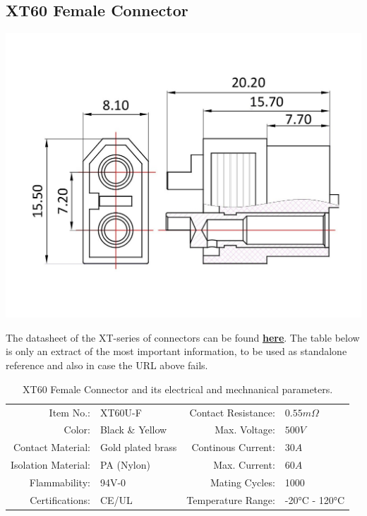 \clearpage %

\subsection{XT60 Female Connector}

\includegraphics[width=\textwidth]{contents/figures/xt60_f.jpg}

The datasheet of the XT-series of connectors can be found \href{https://www.lcsc.com/datasheet/lcsc_datasheet_1810251322_Changzhou-Amass-Elec-XT60-F_C98734.pdf}{\textbf{\underline{here}}}.
The table below is only an extract of the most important information, to be used as standalone reference and also in case the URL above fails.

\begin{table}[h] %
    \begin{tabular}{rlrl}
         Item No.:&  XT60U-F &  Contact Resistance:& $0.55m \Omega$\\
         Color:&  Black \& Yellow&  Max. Voltage:& $500V$\\
         Contact Material:&  Gold plated brass&  Continous Current:& $30A$\\
         Isolation Material:&  PA (Nylon)&  Max. Current:& $60A$\\
         Flammability:&  94V-0&  Mating Cycles:& 1000\\
         Certifications:&  CE/UL&  Temperature Range:& -20°C - 120°C\\
    \end{tabular}
    \caption{XT60 Female Connector and its electrical and mechnanical parameters.}
    \label{tab:xt60_f_specs}
\end{table}


